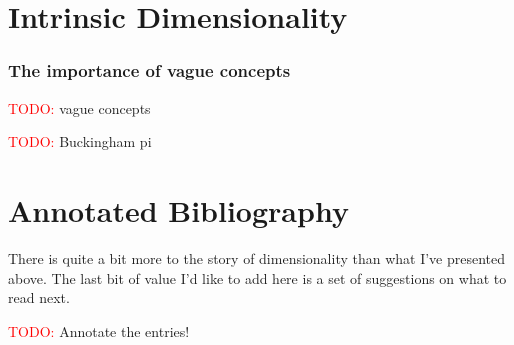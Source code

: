\documentclass{article}
\begin{document}
\section{Intrinsic Dimensionality}

\subsubsection{The importance of vague concepts}
\textcolor{red}{TODO:} vague concepts

\textcolor{red}{TODO:} Buckingham pi

\section{Annotated Bibliography}
There is quite a bit more to the story of dimensionality than what I've
presented above. The last bit of value I'd like to add here is a set of
suggestions on what to read next.

\textcolor{red}{TODO:} Annotate the entries!



\end{document}
